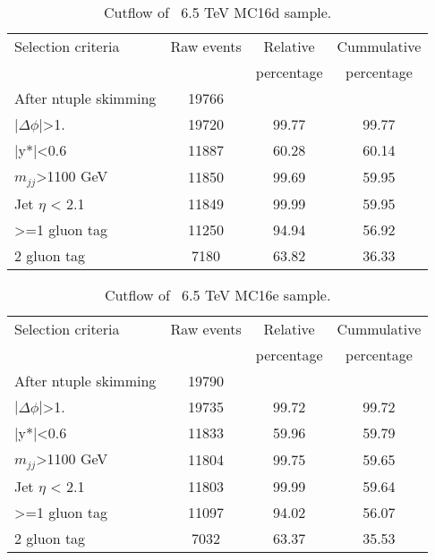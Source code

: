 \begin{table}[ht]
\begin{center}
\begin{tabular}{|l|c|c|c|}
\hline
Selection criteria & Raw events &  Relative & Cummulative \\
 & & percentage & percentage \\
\hline
After ntuple skimming & 19766 &  &  \\
$|\Delta\phi|$>1. & 19720 & 99.77 & 99.77 \\
|y*|<0.6 & 11887 & 60.28 & 60.14 \\
$m_{jj}$>1100 GeV & 11850 & 99.69 & 59.95 \\
Jet $\eta$ < 2.1 & 11849 & 99.99 & 59.95 \\
>=1 gluon tag & 11250 & 94.94 & 56.92 \\
2 gluon tag & 7180 & 63.82 & 36.33 \\
\hline
\end{tabular}
\end{center}
\caption{Cutflow of \Hprime\ 6.5 TeV MC16d sample.}
\end{table}


\clearpage

\begin{table}[ht]
\begin{center}
\begin{tabular}{|l|c|c|c|}
\hline
Selection criteria & Raw events &  Relative & Cummulative \\
 & & percentage & percentage \\
\hline
After ntuple skimming & 19790 &  &  \\
$|\Delta\phi|$>1. & 19735 & 99.72 & 99.72 \\
|y*|<0.6 & 11833 & 59.96 & 59.79 \\
$m_{jj}$>1100 GeV & 11804 & 99.75 & 59.65 \\
Jet $\eta$ < 2.1 & 11803 & 99.99 & 59.64 \\
>=1 gluon tag & 11097 & 94.02 & 56.07 \\
2 gluon tag & 7032 & 63.37 & 35.53 \\
\hline
\end{tabular}
\end{center}
\caption{Cutflow of \Hprime\ 6.5 TeV MC16e sample.}
\end{table}

